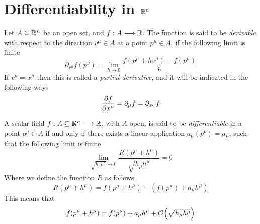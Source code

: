 \documentclass[../complete.tex]{subfiles}
\begin{document}
\section{Differentiability in $\mathbb{R}^n$}
\begin{dfn}
	Let $A\subseteq\mathbb{R}^n$ be an open set, and $f:A\overset{}{\longrightarrow}\mathbb{R}$. The function is said to be \textit{derivable} with respect to the direction $v^\mu\in A$ at a point $p^\mu\in A$, if the following limit is finite
	\begin{equation}
		\partial_{v^\mu}f(p^\nu)=\lim_{h\to0}\frac{f(p^\mu+hv^\mu)-f(p^\mu)}{h}
		\label{eq:directionalder}
	\end{equation}
	If $v^\mu=x^\mu$ then this is called a \textit{partial derivative}, and it will be indicated in the following ways
	\begin{equation}
		\pdv{f}{x^\mu}=\partial_\mu f=\partial_{x^\mu}f
		\label{eq:partialdernot}
	\end{equation}
\end{dfn}
\begin{dfn}[Differentiability]
	A scalar field $f:A\subseteq\mathbb{R}^n\overset{}{\longrightarrow}\mathbb{R}$, with $A$ open, is said to be \textit{differentiable} in a point $p^\mu\in A$ if and only if there exists a linear application $a_\mu(p^\nu)=a_\mu$, such that the following limit is finite
	\begin{equation}
		\lim_{\sqrt{h_\mu h^\mu}\to0}\frac{R(p^\mu+h^\mu)}{\sqrt{h_\mu h^\mu}}=0
		\label{eq:limitrest}
	\end{equation}
	Where we define the function $R$ as follows
	\begin{equation}
		R(p^\mu+h^\mu)=f(p^\mu+h^\mu)-\left( f(p^\mu)+a_\mu h^\mu \right)
		\label{eq:restfunc}
	\end{equation}
	This means that
	\begin{equation}
		f(p^\mu+h^\mu)=f(p^\mu)+a_\mu h^\mu+\order{\sqrt{h_\mu h^\mu}}
		\label{eq:diff}
	\end{equation}
\end{dfn}
\end{document}
